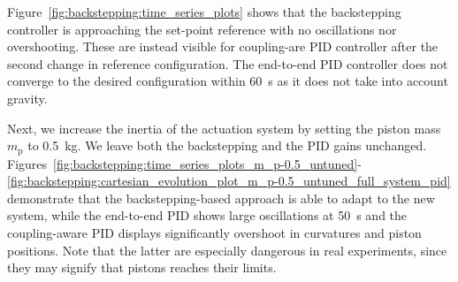 Figure~\ref{fig:backstepping:time_series_plots} shows that the backstepping controller is approaching the set-point reference with no oscillations nor overshooting. These are instead visible for coupling-are PID controller after the second change in reference configuration. 
The end-to-end PID controller does not converge to the desired configuration within \SI{60}{s} as it does not take into account gravity.

Next, we increase the inertia of the actuation system by setting the piston mass $m_\mathrm{p}$ to \SI{0.5}{kg}. We leave both the backstepping and the PID gains unchanged. Figures~\ref{fig:backstepping:time_series_plots_m_p-0.5_untuned}-\ref{fig:backstepping:cartesian_evolution_plot_m_p-0.5_untuned_full_system_pid} demonstrate that the backstepping-based approach is able to adapt to the new system, while the end-to-end PID shows large oscillations at \SI{50}{s} and the coupling-aware PID displays significantly overshoot in curvatures and piston positions. 
Note that the latter are especially dangerous in real experiments, since they may signify that pistons reaches their limits.

